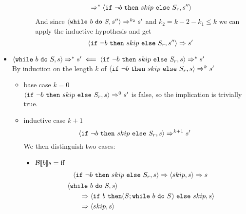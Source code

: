 \begin{exercise}
\begin{itemize}
\begin{itemize}
\begin{itemize}
\begin{align*}
                            \\&\quad\Rightarrow^* \instr{\texttt{if}\ \neg b\ \texttt{then}\ skip\ \texttt{else}\ S_r}{s''}
                        \end{align*}
                        And since $\left<\texttt{while}\ b\ \texttt{do}\ S, s''\right> \Rightarrow^{k_2} s'$ and $k_2 = k - 2 - k_1 \leq k$  we can apply the inductive hypothesis and get
                        \[ \instr{\texttt{if}\ \neg b\ \texttt{then}\ skip\ \texttt{else}\ S_r}{s''} \Rightarrow s' \]
                \end{itemize}
            \end{itemize}
        \item $\instr{\texttt{while}\ b\ \texttt{do}\ S}{s} \Rightarrow^* s' \impliedby \instr{\texttt{if}\ \neg b\ \texttt{then}\ skip\ \texttt{else}\ S_r}{s} \Rightarrow^* s'$ \\
            By induction on the length $k$ of $\instr{\texttt{if}\ \neg b\ \texttt{then}\ skip\ \texttt{else}\ S_r}{s} \Rightarrow^k s'$
            \begin{itemize}
                \item base case $k=0$ \\
                $\instr{\texttt{if}\ \neg b\ \texttt{then}\ skip\ \texttt{else}\ S_r}{s} \Rightarrow^0 s'$ is false, so the implication is trivially true.
                \item inductive case $k+1$ \vspace*{-0.3cm}
                \[ \instr{\texttt{if}\ \neg b\ \texttt{then}\ skip\ \texttt{else}\ S_r}{s} \Rightarrow^{k+1} s' \]
                We then distinguish two cases:
                \begin{itemize}
                    \item $\mathcal{B} \llbracket  b \rrbracket s = \text{ff}$
                    \begin{gather*}
                        \instr{\texttt{if}\ \neg b\ \texttt{then}\ skip\ \texttt{else}\ S_r}{s}
                        \Rightarrow
                        \instr{skip}{s}
                        \Rightarrow s
                        \\
                        \begin{align*}
                            &\instr{\texttt{while}\ b\ \texttt{do}\ S}{s}
                            \\&\qquad\Rightarrow \instr{\texttt{if}\ b\ \texttt{then} (S; \texttt{while}\ b\ \texttt{do}\ S)\ \texttt{else}\ skip}{s}
                            \\&\qquad\Rightarrow \instr{skip}{s}

\end{align*}
\end{gather*}
\end{itemize}
\end{itemize}
\end{itemize}
\end{exercise}
